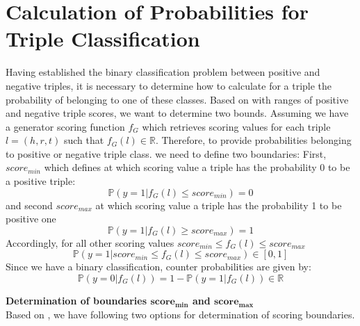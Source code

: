 \section{Calculation of Probabilities for Triple Classification}
\label{sec:calculation_of_probabilities_for_triple_classification}
Having established the binary classification problem between positive and negative triples, it is necessary to determine how to calculate for a triple the probability of belonging to one of these classes.
Based on  with ranges of positive and negative triple scores, we want to determine two bounds.
Assuming we have a generator scoring function $f_G$ which retrieves scoring values for each triple $l = (h,r,t)$ such that $f_G(l) \in \mathbb{R}$.
Therefore, to provide probabilities belonging to positive or negative triple class. we need to define two boundaries:
First, $score_{min}$ which defines at which scoring value a triple has the probability 0 to be a positive triple: 
\begin{equation} \label{eqn:prob_score_min}
    \mathds{P}(y = 1 | f_G(l) \leq score_{min}) = 0
\end{equation}
and second $score_{max}$ at which scoring value a triple has the probability 1 to be positive one 
\begin{equation} \label{eqn:prob_score_max}
    \mathds{P}(y = 1 | f_G(l) \geq score_{max}) = 1
\end{equation}
Accordingly, for all other scoring values $score_{min} \leq f_G(l) \leq score_{max}$
\begin{equation} \label{eqn:prob_score_all}
    \mathds{P}(y = 1 | score_{min} \leq f_G(l) \leq score_{max}) \in [0, 1]
\end{equation}
Since we have a binary classification, counter probabilities are given by:
\begin{equation} \label{eqn:counter_prob}
    \mathds{P}(y = 0 | f_G(l)) = 1 - \mathds{P}(y = 1 | f_G(l)) \in \mathbb{R}
\end{equation}

\textbf{Determination of boundaries $\textbf{score}_{\textbf{min}}$ and $\textbf{score}_{\textbf{max}}$}\\
Based on , we have following two options for determination of scoring boundaries.

